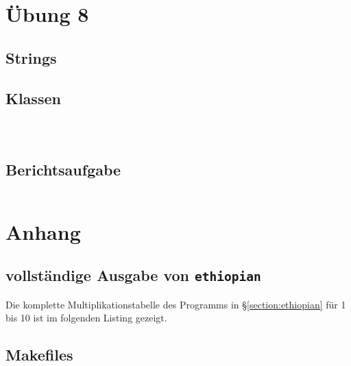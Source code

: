 



\chapter{Übung 8}

\section{Strings}



\section{Klassen}

\inputminted[label=String main.cpp]{c++}{Uebung_08/Student/main.cpp}
\inputminted[label=String student.cpp]{c++}{Uebung_08/Student/student.cpp}
\inputminted[label=String student.h]{c++}{Uebung_08/Student/student.h}

\section{Berichtsaufgabe}
\inputminted[label=Consolidator]{c++}{Uebung_08/Consolidator/main.cpp}

\chapter{Anhang}


\section{vollständige Ausgabe von \texttt{ethiopian}}

Die komplette Multiplikationstabelle des Programms in §\ref{section:ethiopian} für 1 bis 10 ist im folgenden Listing gezeigt.


\section{Makefiles}
\inputminted[label=makefile.common]{make}{makefile.common}




